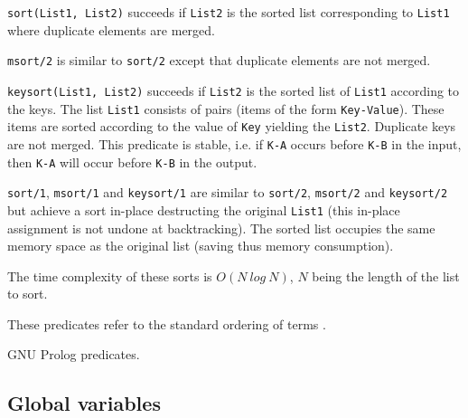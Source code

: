 \Description

\texttt{sort(List1, List2)} succeeds if \texttt{List2} is the
sorted list corresponding to \texttt{List1} where duplicate elements are
merged.

\texttt{msort/2} is similar to \texttt{sort/2} except that duplicate elements
are not merged.

\texttt{keysort(List1, List2)} succeeds if \texttt{List2} is the
sorted list of \texttt{List1} according to the keys. The list \texttt{List1}
consists of pairs (items of the form \texttt{Key-Value}). These items are sorted
according to the value of \texttt{Key} yielding the \texttt{List2}. Duplicate
keys are not merged. This predicate is stable, i.e. if \texttt{K-A} occurs
before \texttt{K-B} in the input, then \texttt{K-A} will occur before
\texttt{K-B} in the output.

\texttt{sort/1}, \texttt{msort/1} and \texttt{keysort/1} are similar to
\texttt{sort/2}, \texttt{msort/2} and \texttt{keysort/2} but achieve a sort
in-place destructing the original \texttt{List1} (this in-place assignment is
not undone at backtracking). The sorted list occupies the same memory space
as the original list (saving thus memory consumption).

The time complexity of these sorts is $O(N~log~N)$, $N$ being the length of
the list to sort.

These predicates refer to the standard ordering of terms
. 

\begin{PlErrors}






\end{PlErrors}

\Portability

GNU Prolog predicates.

\subsection{Global variables}

